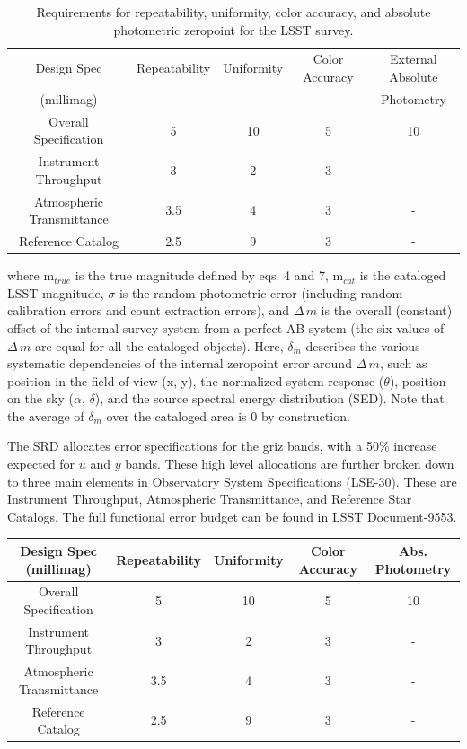 \documentclass[SE,authoryear,lsstdraft,toc]{lsstdoc}
\newcommand{\deltam}{\delta_m}
\newcommand{\Deltam}{\Delta\,m}
\begin{document}
\begin{table}
\centering
\begin{tabular}{|c|c|c|c|c|}
\hline
Design Spec & Repeatability & Uniformity & Color Accuracy & External Absolute  \\
 (millimag) &  &  &  & Photometry \\
\hline\hline
Overall Specification & 5 &  10 & 5 & 10 \\
Instrument Throughput & 3 & 2 & 3 & -  \\
Atmospheric Transmittance & 3.5 & 4 & 3 & - \\
Reference Catalog & 2.5 & 9 & 3 & - \\
\hline
\end{tabular}
\caption{Requirements for repeatability, uniformity, color accuracy, and
  absolute photometric zeropoint for the LSST survey.}
\label{tab:table1}
\end{table}
%
where $\textrm{m}_{true}$ is the true magnitude defined by eqs. 4 and 7,
$\textrm{m}_{cat}$ is the cataloged LSST magnitude, $\sigma$ is the random
photometric error (including random calibration errors and count extraction
errors), and $\Deltam$ is the overall (constant) offset of the internal survey
system from a perfect AB system (the six values of $\Deltam$ are equal for all
the cataloged objects).  Here, $\deltam$ describes the various systematic
dependencies of the internal zeropoint error around $\Deltam$, such as position
in the field of view (x, y), the normalized system response ($\theta$),
position on the sky ($\alpha$, $\delta$), and the source spectral energy
distribution (SED).  Note that the average of $\deltam$ over the cataloged area
is 0 by construction.

The SRD allocates error specifications for the griz bands, with a 50\% increase
expected for $u$ and $y$ bands.  These high level allocations are further broken
down to three main elements in Observatory System Specifications (LSE-30).
These are Instrument Throughput, Atmospheric Transmittance, and Reference Star
Catalogs.  The full functional error budget can be found in LSST Document-9553.

\begin{table}
    \begin{tabular}{|c|c|c|c|c|}
        \hline
        Design Spec (millimag) & Repeatability & Uniformity & Color Accuracy & Abs. Photometry \\
        \hline
        \hline
        Overall Specification & 5 & 10 & 5 & 10 \\
        \hline
        Instrument Throughput & 3 & 2 & 3 & - \\
        \hline
        Atmospheric Transmittance & 3.5 & 4 & 3 & - \\
        \hline
        Reference Catalog & 2.5 & 9 & 3 & - \\
        \hline
    \end{tabular}

\end{table}
\end{document}
